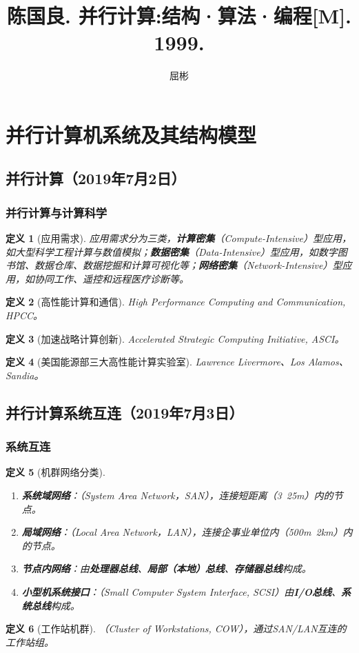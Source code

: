 \documentclass{article}
\newtheorem{definition}{定义}[section]
\begin{document}
	\title{陈国良. 并行计算:结构·算法·编程[M]. 1999.}
	\author{屈彬}
	\maketitle
	
	\section{并行计算机系统及其结构模型}
		\subsection{并行计算（2019年7月2日）}
			\subsubsection{并行计算与计算科学}
				\begin{definition}[应用需求]
					应用需求分为三类，\textbf{计算密集}（Compute-Intensive）型应用，如大型科学工程计算与数值模拟；\textbf{数据密集}（Data-Intensive）型应用，如数字图书馆、数据仓库、数据挖掘和计算可视化等；\textbf{网络密集}（Network-Intensive）型应用，如协同工作、遥控和远程医疗诊断等。
				\end{definition}
				\begin{definition}[高性能计算和通信]
					High Performance Computing and Communication, HPCC。
				\end{definition}
				\begin{definition}[加速战略计算创新]
					Accelerated Strategic Computing Initiative, ASCI。
				\end{definition}
				\begin{definition}[美国能源部三大高性能计算实验室]
					Lawrence Livermore、Los Alamos、Sandia。
				\end{definition}
		\subsection{并行计算系统互连（2019年7月3日）}
			\subsubsection{系统互连}
				\begin{definition}[机群网络分类]
					\begin{enumerate}
						\item \textbf{系统域网络}：（System Area Network，SAN），连接短距离（3~25m）内的节点。
						\item \textbf{局域网络}：（Local Area Network，LAN），连接企事业单位内（500m~2km）内的节点。
						\item \textbf{节点内网络}：由\textbf{处理器总线}、\textbf{局部（本地）总线}、\textbf{存储器总线}构成。
						\item \textbf{小型机系统接口}：（Small Computer System Interface, SCSI）由\textbf{I/O总线}、\textbf{系统总线}构成。
					\end{enumerate}
				\end{definition}
				\begin{definition}[工作站机群]
					（Cluster of Workstations, COW），通过SAN/LAN互连的工作站组。
				\end{definition}
\end{document}
